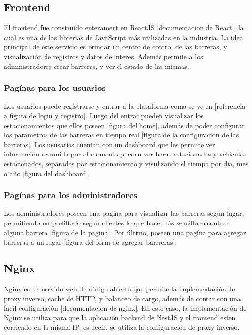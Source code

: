 \subsection{Frontend}

El frontend fue construido enterament en ReactJS [documentacion de React], la cual es una de las librerias de JavaScript más utilizadas en la industria. La idea principal de este servicio es brindar un centro de control de las barreras, y visualización de registros y datos de interes. Además permite a los administradores crear barreras, y ver el estado de las mismas.

\subsubsection*{Pagínas para los usuarios}

Los usuarios puede registrarse y entrar a la plataforma como se ve en [referencia a figura de login y registro]. Luego del entrar pueden visualizar los estacionamientos que ellos poseen [figura del home], además de poder configurar los parametros de las barreras en tiempo real [figura de la configuracion de las barreras]. Los ususarios cuentan con un dashboard que les permite ver información resumida por el momento pueden ver horas estacionadas y vehiculos estacionados, separados por estacionamiento y visulizando el tiempo por día, mes o año [figura del dashboard].

\subsubsection*{Pagínas para los administradores}

Los administradores poseen una pagina para visualizar las barreras según lugar, permitiendo un prefiltado según clientes lo que hace más sencillo encontrar alguna barrera [figura de la pagina]. Por último, poseen una pagína para agregar barreras a un lugar [figura del form de agregar barrreras].

\subsection{Nginx}

Nginx es un servido web de código abierto que permite la implementación de proxy inverso, cache de HTTP, y balanceo de cargo, además de contar con una facíl configuración [documentacion de nginx].
En este caso, la implementación de Nginx se utiliza para que la aplicación backend de NestJS y el frontend esten corriendo en la misma IP, es decir, se utiliza la configuración de proxy inverso.